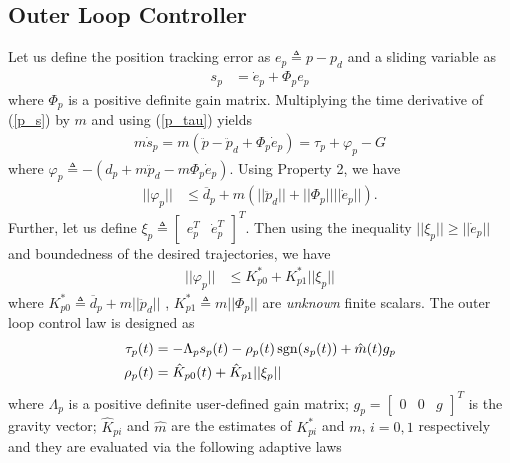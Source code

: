      \subsection{Outer Loop Controller}
Let us define the position tracking error as $e_p \triangleq p - p_d$ and
a sliding variable as
\begin{align}
     s_p &= \dot{e}_p + \Phi_p e_p \label{p_s}
 \end{align}
where $\Phi_{p}$ is a positive definite gain matrix. Multiplying the time derivative of (\ref{p_s}) by $m$ and using (\ref{p_tau}) yields
\begin{align}
     m\dot{s}_p = m(\ddot{p}-\ddot{p}_d + \Phi_p \dot{e}_p) = \tau_p + \varphi_p - G \label{dot_s_p}
\end{align}
where $\varphi_p
\triangleq -(d_p + m\ddot{p}_d - m\Phi_p\dot{e}_p)$. Using Property 2, we have
\begin{align}
 ||\varphi_p|| &\leq \overline{d}_p + {m}(||\ddot{p}_d|| + ||\Phi_p||  ||\dot{e}_p||).
\end{align}
Further, let us define $\xi_p \triangleq
\begin{bmatrix}
    e_p^T & \dot{e}_p^T
\end{bmatrix}^T$. Then using the inequality $||\xi_p|| \geq ||\dot{e}_p||$ and boundedness of the desired trajectories, we have
\begin{align}
    ||\varphi_p|| &\leq K_{p0}^* + K_{p1}^*||\xi_p||  \label{p_up_bound_K}
\end{align}
where $K_{p0}^* \triangleq {\overline{d}_p + m||\ddot{p}_d||}$ , $K_{p1}^* \triangleq m||\Phi_p||$ are \textit{unknown} finite scalars. The outer loop control law is designed as
\begin{subequations}\label{ip_out}
\begin{align}
    \tau_p (t) &= -\Lambda_p s_p (t) - \rho_p (t) \operatorname{sgn}(s_p(t)) + \hat{m}(t) g_p \label{p_con_tau}\\
    \rho_p(t) &= \hat{K}_{p0}(t) + \hat{K}_{p1}||\xi_p|| \label{p_con_rho}
\end{align}
\end{subequations}
where $\Lambda_p$ is a positive definite user-defined gain matrix; $g_p =  
    \begin{bmatrix}
        0 & 0 & g
    \end{bmatrix}^T$ is the gravity vector; $\hat{K}_{pi}$ and $\hat{m}$ are the estimates of $K_{pi}^*$ and ${m}$, $i=0,1$ respectively and they are evaluated via the following adaptive laws
